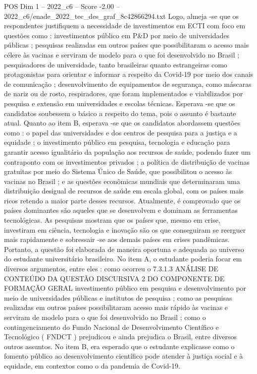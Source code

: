 \begin{textsample}{POS Dim 1 – 2022\_c6 – Score -2.00 – 2022\_c6/enade\_2022\_tec\_des\_graf\_8c42866294.txt}
Logo, almeja -se que os respondentes justifiquem a necessidade de investimentos em ECTI com foco em questões como : investimentos público em P\&D por meio de universidades públicas ; pesquisas realizadas em outros países que possibilitaram o acesso mais célere às vacinas e serviram de modelo para o que foi desenvolvido no Brasil ; pesquisadores de universidade, tanto brasileiras quanto estrangeiras como protagonistas para orientar e informar a respeito da Covid-19 por meio dos canais de comunicação ; desenvolvimento de equipamentos de segurança, como máscaras de nariz ou de rosto, respiradores, que foram implementados e viabilizados por pesquisa e extensão em universidades e escolas técnicas.
Esperava -se que os candidatos soubessem o básico a respeito do tema, pois o assunto é bastante atual.
Quanto ao item B, esperava -se que os candidatos abordassem questões como : o papel das universidades e dos centros de pesquisa para a justiça e a equidade ; o investimento público em pesquisa, tecnologia e educação para garantir acesso igualitário da população aos recursos de saúde, podendo fazer um contraponto com os investimentos privados ; a política de distribuição de vacinas gratuitas por meio do Sistema Único de Saúde, que possibilitou o acesso às vacinas no Brasil ; e as questões econômicas mundiais que determinaram uma distribuição desigual de recursos de saúde em escala global, com os países mais ricos retendo a maior parte desses recursos.
Atualmente, é comprovado que os países dominantes são aqueles que se desenvolvem e dominam as ferramentas tecnológicas.
As pesquisas mostram que os países que, mesmo em crise, investiram em ciência, tecnologia e inovação são os que conseguiram se reerguer mais rapidamente e sobressair -se aos demais países em crises pandêmicas.
Portanto, a questão foi elaborada de maneira oportuna e adequada ao universo do estudante universitário brasileiro.
No item A, o estudante poderia focar em diversos argumentos, entre eles : como ocorreu o 7.3.1.3 ANÁLISE DE CONTEÚDO DA QUESTÃO DISCURSIVA 2 DO COMPONENTE DE FORMAÇÃO GERAL investimento público em pesquisa e desenvolvimento por meio de universidades públicas e institutos de pesquisa ; como as pesquisas realizadas em outros países possibilitaram acesso mais rápido às vacinas e serviram de modelo para o que foi desenvolvido no Brasil ; como o contingenciamento do Fundo Nacional de Desenvolvimento Científico e Tecnológico ( FNDCT ) prejudicou e ainda prejudica o Brasil, entre diversos outros assuntos.
No item B, era esperado que o estudante explicasse como o fomento público ao desenvolvimento científico pode atender à justiça social e à equidade, em contextos como o da pandemia de Covid-19.

\end{textsample}
